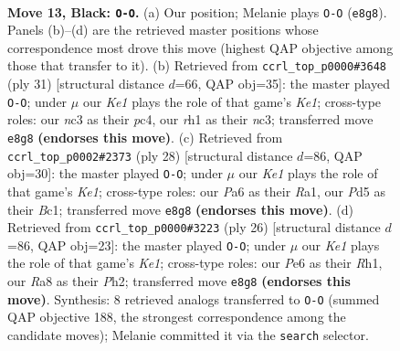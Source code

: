 \documentclass[11pt]{article}
\begin{document}
\begin{figure}[p]
\label{fig:thought-m23}
\end{figure}

\clearpage

\begin{figure}[p]\centering
\begin{subfigure}{0.46\textwidth}\centering
\resizebox{\linewidth}{!}{%
\newchessgame
\chessboard[
  setfen={r2qk2r/p4p1p/p3pbp1/3p4/P2P1QP1/2N4P/1PP2P2/R3K2R b KQkq - 1 13},
  showmover=false,
  pgfstyle=straightmove, color=movearrow, markmove={e8-g8}
]}
\caption{}
\end{subfigure}\hfill
\begin{subfigure}{0.46\textwidth}\centering
\resizebox{\linewidth}{!}{%
\newchessgame
\chessboard[
  setfen={r2qk2r/p2p1pp1/1p2p2p/8/2PP2Qb/2NR4/PP3PPP/5RK1 b kq - 0 16},
  showmover=false,
  pgfstyle=straightmove, color=movearrow, markmove={e8-g8}
]}
\caption{}
\end{subfigure}
\\[4pt]
\begin{subfigure}{0.46\textwidth}\centering
\resizebox{\linewidth}{!}{%
\newchessgame
\chessboard[
  setfen={r3kb1r/3q1ppp/pp6/2pPp3/P1P5/6P1/1P3P1P/R1BQK2R w KQkq - 0 15},
  showmover=false,
  pgfstyle=straightmove, color=movearrow, markmove={e1-g1}
]}
\caption{}
\end{subfigure}\hfill
\begin{subfigure}{0.46\textwidth}\centering
\resizebox{\linewidth}{!}{%
\newchessgame
\chessboard[
  setfen={r3k2r/pbp2pp1/1p2pq1p/8/P1BP4/2P1P3/5PPP/R2QK2R w KQkq - 1 14},
  showmover=false,
  pgfstyle=straightmove, color=movearrow, markmove={e1-g1}
]}
\caption{}
\end{subfigure}
\caption{\textbf{Move 13, Black: \texttt{O-O}.} (a) Our position; Melanie plays \texttt{O-O} (\texttt{e8g8}). Panels (b)--(d) are the retrieved master positions whose correspondence most drove this move (highest QAP objective among those that transfer to it). (b) Retrieved from \texttt{ccrl\_top\_p0000\#3648} (ply 31) [structural distance $d$=66, QAP obj=35]: the master played \texttt{O-O}; under $\mu$ our \emph{Ke1} plays the role of that game's \emph{Ke1}; cross-type roles: our \emph{n}c3 as their \emph{p}c4, our \emph{r}h1 as their \emph{n}c3; transferred move \texttt{e8g8} \textbf{(endorses this move)}. (c) Retrieved from \texttt{ccrl\_top\_p0002\#2373} (ply 28) [structural distance $d$=86, QAP obj=30]: the master played \texttt{O-O}; under $\mu$ our \emph{Ke1} plays the role of that game's \emph{Ke1}; cross-type roles: our \emph{P}a6 as their \emph{R}a1, our \emph{P}d5 as their \emph{B}c1; transferred move \texttt{e8g8} \textbf{(endorses this move)}. (d) Retrieved from \texttt{ccrl\_top\_p0000\#3223} (ply 26) [structural distance $d$=86, QAP obj=23]: the master played \texttt{O-O}; under $\mu$ our \emph{Ke1} plays the role of that game's \emph{Ke1}; cross-type roles: our \emph{P}e6 as their \emph{R}h1, our \emph{R}a8 as their \emph{P}h2; transferred move \texttt{e8g8} \textbf{(endorses this move)}. Synthesis: 8 retrieved analogs transferred to \texttt{O-O} (summed QAP objective 188, the strongest correspondence among the candidate moves); Melanie committed it via the \texttt{search} selector.}

\end{figure}
\end{document}

